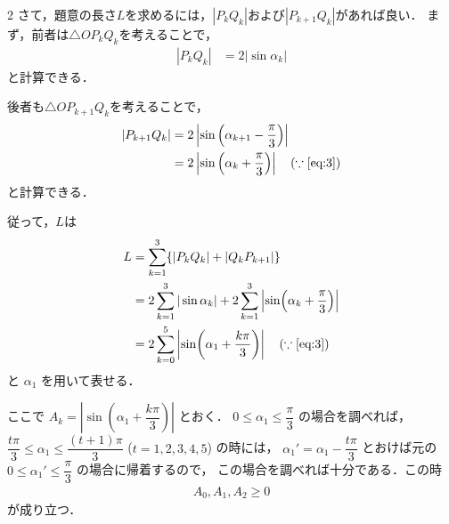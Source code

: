 \documentclass[../../main.tex]{subfiles}
\begin{document}
\begin{multicols}{2}
  さて，題意の長さ$L$を求めるには，$|P_{k}Q_{k}|$および$|P_{k+1}Q_{k}|$があれば良い．
  まず，前者は$\triangle OP_{k}Q_{k}$を考えることで，
  \begin{align}
    |P_{k}Q_{k}|
    & = 2\left|\sin \alpha_{k}\right|
  \end{align}
  と計算できる．

  後者も$\triangle OP_{k+1}Q_{k}$を考えることで，
  \begin{align}
    |P_{k+1}Q_{k}|
    & = 2\left|\sin \left(\alpha_{k+1}-\dfrac{\pi}{3}\right)\right|                                          \\
    & = 2\left|\sin \left(\alpha_{k}+\dfrac{\pi}{3}\right)\right| \quad (\because \text{\cref{eq:3}})
  \end{align}
  と計算できる．

  従って，$L$は
  \begin{align}
    L
    & = \sum_{k=1}^3 \{ |P_k Q_k| + |Q_k P_{k+1}| \}                                                              \\
    & = 2 \sum_{k=1}^3 |\sin \alpha_k| + 2 \sum_{k=1}^3 \left|\sin (\alpha_k + \dfrac{\pi}{3})\right|              \\
    & = 2 \sum_{k=0}^{5} \left|\sin (\alpha_1 + \dfrac{k\pi}{3})\right| \quad (\because \text{\cref{eq:3}})
  \end{align}
  と $\alpha_1$ を用いて表せる．

  ここで $A_k = |\sin(\alpha_1 + \dfrac{k\pi}{3})|$ とおく．
  $0 \le \alpha_1 \le \dfrac{\pi}{3}$ の場合を調べれば，$\dfrac{t \pi}{3} \le \alpha_1 \le \dfrac{(t+1)\pi}{3}$ ($t=1,2,3,4,5$) の時には，
  $\alpha_1' = \alpha_1 - \dfrac{t\pi}{3}$ とおけば元の
  $0 \le \alpha_1' \le \dfrac{\pi}{3}$ の場合に帰着するので，
  この場合を調べれば十分である．この時
  \begin{align}
    A_0, A_1, A_2 \ge 0 \label{eq:4}
  \end{align}
  が成り立つ．


\end{multicols}
\end{document}
